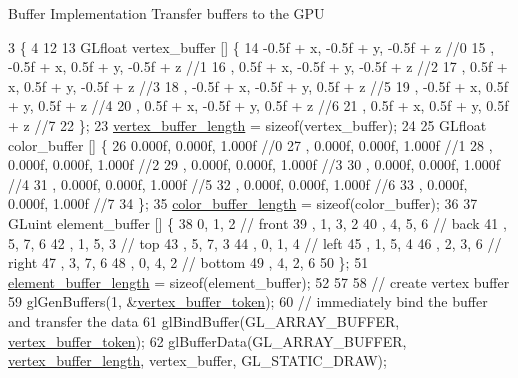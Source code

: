 Buffer Implementation Transfer buffers to the G\+P\+U
\begin{DoxyCode}
3                                                     \{
4 
12 
13   GLfloat vertex\_buffer [] \{
14       -0.5f + x, -0.5f + y, -0.5f + z   \textcolor{comment}{//0}
15     , -0.5f + x,  0.5f + y, -0.5f + z   \textcolor{comment}{//1}
16     ,  0.5f + x, -0.5f + y, -0.5f + z   \textcolor{comment}{//2}
17     ,  0.5f + x,  0.5f + y, -0.5f + z   \textcolor{comment}{//3}
18     , -0.5f + x, -0.5f + y,  0.5f + z   \textcolor{comment}{//5}
19     , -0.5f + x,  0.5f + y,  0.5f + z   \textcolor{comment}{//4}
20     ,  0.5f + x, -0.5f + y,  0.5f + z   \textcolor{comment}{//6}
21     ,  0.5f + x,  0.5f + y,  0.5f + z   \textcolor{comment}{//7}
22   \};
23   \hyperlink{classCubeAsset_a3054ed8a7d6cc1575aebdfc40038847b}{vertex\_buffer\_length} = \textcolor{keyword}{sizeof}(vertex\_buffer);
24 
25   GLfloat color\_buffer [] \{
26       0.000f, 0.000f, 1.000f \textcolor{comment}{//0}
27     , 0.000f, 0.000f, 1.000f \textcolor{comment}{//1}
28     , 0.000f, 0.000f, 1.000f \textcolor{comment}{//2}
29     , 0.000f, 0.000f, 1.000f \textcolor{comment}{//3}
30     , 0.000f, 0.000f, 1.000f \textcolor{comment}{//4}
31     , 0.000f, 0.000f, 1.000f \textcolor{comment}{//5}
32     , 0.000f, 0.000f, 1.000f \textcolor{comment}{//6}
33     , 0.000f, 0.000f, 1.000f \textcolor{comment}{//7}
34   \};
35   \hyperlink{classCubeAsset_ac4c2395c395e9bcebc5d15d425a505ec}{color\_buffer\_length} = \textcolor{keyword}{sizeof}(color\_buffer);
36 
37   GLuint element\_buffer []  \{
38       0, 1, 2  \textcolor{comment}{// front}
39     , 1, 3, 2  
40     , 4, 5, 6  \textcolor{comment}{// back}
41     , 5, 7, 6  
42     , 1, 5, 3  \textcolor{comment}{// top}
43     , 5, 7, 3 
44     , 0, 1, 4  \textcolor{comment}{// left}
45     , 1, 5, 4  
46     , 2, 3, 6  \textcolor{comment}{// right}
47     , 3, 7, 6  
48     , 0, 4, 2  \textcolor{comment}{// bottom}
49     , 4, 2, 6     
50   \};
51   \hyperlink{classCubeAsset_ac66c2ec869f392515dad4ebda1fe4792}{element\_buffer\_length} = \textcolor{keyword}{sizeof}(element\_buffer);
52 
57 
58   \textcolor{comment}{// create vertex buffer}
59   glGenBuffers(1, &\hyperlink{classCubeAsset_a31bd098f60e2c24988316a9cc9335987}{vertex\_buffer\_token});
60   \textcolor{comment}{// immediately bind the buffer and transfer the data}
61   glBindBuffer(GL\_ARRAY\_BUFFER, \hyperlink{classCubeAsset_a31bd098f60e2c24988316a9cc9335987}{vertex\_buffer\_token});
62   glBufferData(GL\_ARRAY\_BUFFER, \hyperlink{classCubeAsset_a3054ed8a7d6cc1575aebdfc40038847b}{vertex\_buffer\_length}, vertex\_buffer, GL\_STATIC\_DRAW);

\end{DoxyCode}
